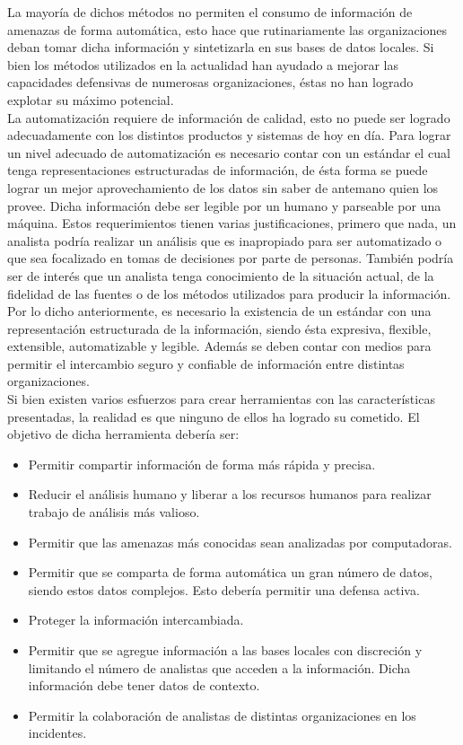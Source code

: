 La mayoría de dichos 
métodos no permiten el consumo de información de amenazas de forma automática, 
esto hace que rutinariamente las organizaciones deban tomar dicha información y 
sintetizarla en sus bases de datos locales. Si bien los métodos utilizados en la 
actualidad han ayudado a mejorar las capacidades defensivas de numerosas 
organizaciones, éstas no han logrado explotar su máximo potencial.\\

La automatización requiere de información de calidad, esto 
no puede ser logrado adecuadamente con los distintos productos y sistemas de hoy en 
día. Para lograr un nivel adecuado de automatización es necesario contar con un 
estándar el cual tenga representaciones estructuradas de información, de ésta 
forma se puede lograr un mejor aprovechamiento de los datos sin saber de 
antemano quien los provee. Dicha información debe ser legible por un humano y 
parseable por una máquina. Estos requerimientos tienen varias justificaciones, 
primero que nada, un analista podría realizar un análisis que es inapropiado 
para ser automatizado o que sea focalizado en tomas de decisiones por parte de 
personas. También podría ser de interés que un analista tenga conocimiento de la 
situación actual,  de la fidelidad de las fuentes o de los métodos utilizados 
para producir la información. Por lo dicho anteriormente, es necesario la 
existencia de un estándar con una representación estructurada de la información, siendo ésta 
expresiva, flexible, extensible, automatizable y legible. Además se deben contar 
con medios para permitir el intercambio seguro y confiable de información entre 
distintas organizaciones.\\

Si bien existen varios esfuerzos para crear herramientas con las características 
presentadas, la realidad es que ninguno de ellos ha logrado su cometido. El 
objetivo de dicha herramienta debería ser:
\begin{itemize}
  \item Permitir compartir información de forma más rápida y precisa.
  \item Reducir el análisis humano y liberar a los recursos humanos para 
  realizar trabajo de análisis más valioso.
  \item Permitir que las amenazas más conocidas sean analizadas por 
  computadoras.
  \item Permitir que se comparta de forma automática un gran número de datos, 
  siendo estos datos complejos. Esto debería permitir una defensa activa.
  \item Proteger la información intercambiada.
  \item Permitir que se agregue información a las bases locales con discreción y 
  limitando el número de analistas que acceden a la información. Dicha 
  información debe tener datos de contexto.
  \item Permitir la colaboración de analistas de distintas organizaciones en los 
  incidentes.
\end{itemize}
